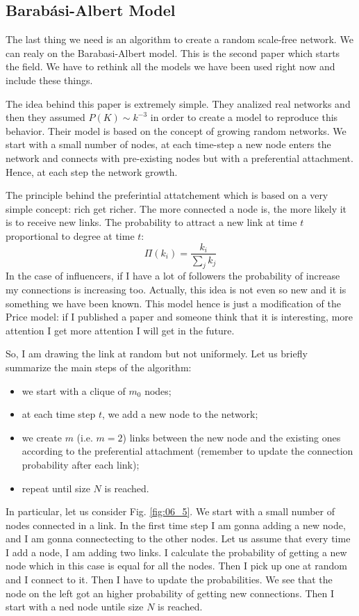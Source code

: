 \documentclass[../main/main.tex]{subfiles}
\begin{document}
\subsection{Barabási-Albert Model}
The last thing we need is an algorithm to create a random scale-free network. We can realy on the Barabasi-Albert model. This is the second paper which starts the field. We have to rethink all the models we have been used right now and include these things.

The idea behind this paper is extremely simple. They analized real networks and then they assumed \( P(K) \sim k^{-3} \) in order to create a model to reproduce this behavior.
Their model is based on the concept of growing random networks.
We start with a small number of nodes, at each time-step a new node enters the network and connects with pre-existing nodes but with a preferential attachment.
Hence, at each step the network growth.

The principle behind the preferintial attatchement which is based on a very simple concept: rich get richer. The more connected a node is, the more likely it is to receive new links. The probability to attract a new link at time $t$ proportional to degree at time $t$:
\begin{equation}
  \Pi (k_i) = \frac{k_i}{\sum_{j}^{} k_j }
\end{equation}
In the case of influencers, if I have a lot of followers the probability of increase my connections is increasing too. Actually, this idea is not even so new and it is something we have been known. This model hence is just a modification of the Price model: if I published a paper and someone think that it is interesting, more attention I get more attention I will get in the future.


So, I am drawing the link at random but not uniformely. Let us briefly summarize the main steps of the algorithm:
\begin{itemize}
\item we start with a clique of \( m_0 \) nodes;
\item at each time step \( t \), we add a new node to the network;
\item we create $m$ (i.e. $m=2$) links between the new node and the existing ones according to the preferential attachment (remember to update the connection probability after each link);
\item repeat until size $N$ is reached.
\end{itemize}
In particular, let us consider Fig. \ref{fig:06_5}. We start with a small number of nodes connected in a link. In the first time step I am gonna adding a new node, and I am gonna connectecting to the other nodes. Let us assume that every time I add a node, I am adding two links. I calculate the probability of getting a new node which in this case is equal for all the nodes. Then I pick up one at random and I connect to it. Then I have to update the probabilities. We see that the node on the left got an higher probability of getting new connections. Then I start with a ned node untile size \( N \) is reached.
\end{document}
